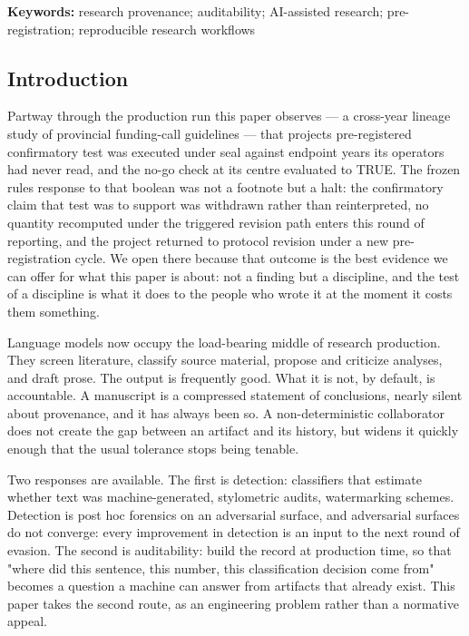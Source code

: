 \documentclass[
  english,
]{article}
\begin{document}
\textbf{Keywords:} research provenance; auditability; AI-assisted research; pre-registration; reproducible research workflows

\subsection{Introduction}\label{introduction}

Partway through the production run this paper observes --- a cross-year lineage study of provincial funding-call guidelines --- that project\textquotesingle s pre-registered confirmatory test was executed under seal against endpoint years its operators had never read, and the no-go check at its centre evaluated to TRUE. The frozen rule\textquotesingle s response to that boolean was not a footnote but a halt: the confirmatory claim that test was to support was withdrawn rather than reinterpreted, no quantity recomputed under the triggered revision path enters this round of reporting, and the project returned to protocol revision under a new pre-registration cycle. We open there because that outcome is the best evidence we can offer for what this paper is about: not a finding but a discipline, and the test of a discipline is what it does to the people who wrote it at the moment it costs them something.

Language models now occupy the load-bearing middle of research production. They screen literature, classify source material, propose and criticize analyses, and draft prose. The output is frequently good. What it is not, by default, is accountable. A manuscript is a compressed statement of conclusions, nearly silent about provenance, and it has always been so. A non-deterministic collaborator does not create the gap between an artifact and its history, but widens it quickly enough that the usual tolerance stops being tenable.

Two responses are available. The first is detection: classifiers that estimate whether text was machine-generated, stylometric audits, watermarking schemes. Detection is post hoc forensics on an adversarial surface, and adversarial surfaces do not converge: every improvement in detection is an input to the next round of evasion. The second is auditability: build the record at production time, so that "where did this sentence, this number, this classification decision come from" becomes a question a machine can answer from artifacts that already exist. This paper takes the second route, as an engineering problem rather than a normative appeal.
\end{document}
